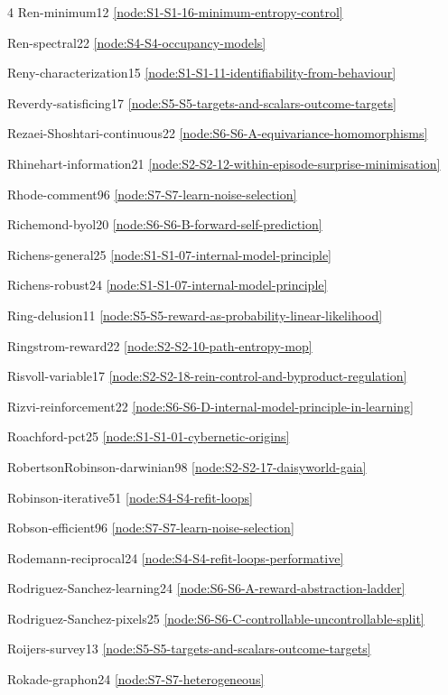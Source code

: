 \documentclass[10pt]{article}
\begin{document}
{\begin{multicols}{4}
Ren-minimum12 \hfill \ref{node:S1-S1-16-minimum-entropy-control}\par
Ren-spectral22 \hfill \ref{node:S4-S4-occupancy-models}\par
Reny-characterization15 \hfill \ref{node:S1-S1-11-identifiability-from-behaviour}\par
Reverdy-satisficing17 \hfill \ref{node:S5-S5-targets-and-scalars-outcome-targets}\par
Rezaei-Shoshtari-continuous22 \hfill \ref{node:S6-S6-A-equivariance-homomorphisms}\par
Rhinehart-information21 \hfill \ref{node:S2-S2-12-within-episode-surprise-minimisation}\par
Rhode-comment96 \hfill \ref{node:S7-S7-learn-noise-selection}\par
Richemond-byol20 \hfill \ref{node:S6-S6-B-forward-self-prediction}\par
Richens-general25 \hfill \ref{node:S1-S1-07-internal-model-principle}\par
Richens-robust24 \hfill \ref{node:S1-S1-07-internal-model-principle}\par
Ring-delusion11 \hfill \ref{node:S5-S5-reward-as-probability-linear-likelihood}\par
Ringstrom-reward22 \hfill \ref{node:S2-S2-10-path-entropy-mop}\par
Risvoll-variable17 \hfill \ref{node:S2-S2-18-rein-control-and-byproduct-regulation}\par
Rizvi-reinforcement22 \hfill \ref{node:S6-S6-D-internal-model-principle-in-learning}\par
Roachford-pct25 \hfill \ref{node:S1-S1-01-cybernetic-origins}\par
RobertsonRobinson-darwinian98 \hfill \ref{node:S2-S2-17-daisyworld-gaia}\par
Robinson-iterative51 \hfill \ref{node:S4-S4-refit-loops}\par
Robson-efficient96 \hfill \ref{node:S7-S7-learn-noise-selection}\par
Rodemann-reciprocal24 \hfill \ref{node:S4-S4-refit-loops-performative}\par
Rodriguez-Sanchez-learning24 \hfill \ref{node:S6-S6-A-reward-abstraction-ladder}\par
Rodriguez-Sanchez-pixels25 \hfill \ref{node:S6-S6-C-controllable-uncontrollable-split}\par
Roijers-survey13 \hfill \ref{node:S5-S5-targets-and-scalars-outcome-targets}\par
Rokade-graphon24 \hfill \ref{node:S7-S7-heterogeneous}\par

\end{multicols}}
\end{document}
